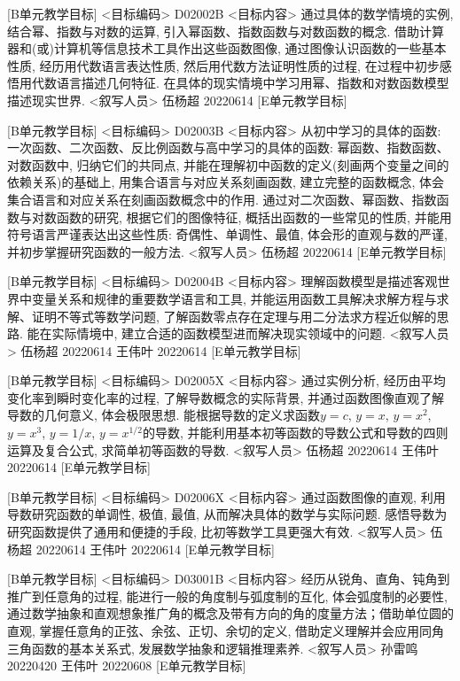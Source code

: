 \documentclass[10pt,a4paper]{article}
\begin{document}
[B单元教学目标]
<目标编码>
D02002B
<目标内容>
通过具体的数学情境的实例, 结合幂、指数与对数的运算, 引入幂函数、指数函数与对数函数的概念. 借助计算器和(或)计算机等信息技术工具作出这些函数图像, 通过图像认识函数的一些基本性质, 经历用代数语言表达性质, 然后用代数方法证明性质的过程, 在过程中初步感悟用代数语言描述几何特征. 在具体的现实情境中学习用幂、指数和对数函数模型描述现实世界.
<叙写人员>
伍杨超  20220614
[E单元教学目标]
 
[B单元教学目标]
<目标编码>
D02003B
<目标内容>
从初中学习的具体的函数: 一次函数、二次函数、反比例函数与高中学习的具体的函数: 幂函数、指数函数、对数函数中, 归纳它们的共同点, 并能在理解初中函数的定义(刻画两个变量之间的依赖关系)的基础上, 用集合语言与对应关系刻画函数, 建立完整的函数概念, 体会集合语言和对应关系在刻画函数概念中的作用. 通过对二次函数、幂函数、指数函数与对数函数的研究, 根据它们的图像特征, 概括出函数的一些常见的性质, 并能用符号语言严谨表达出这些性质: 奇偶性、单调性、最值, 体会形的直观与数的严谨, 并初步掌握研究函数的一般方法.
<叙写人员>
伍杨超  20220614
[E单元教学目标]
 
[B单元教学目标]
<目标编码>
D02004B
<目标内容>
理解函数模型是描述客观世界中变量关系和规律的重要数学语言和工具, 并能运用函数工具解决求解方程与求解、证明不等式等数学问题, 了解函数零点存在定理与用二分法求方程近似解的思路. 能在实际情境中, 建立合适的函数模型进而解决现实领域中的问题.
<叙写人员>
伍杨超  20220614
王伟叶  20220614
[E单元教学目标]
 
[B单元教学目标]
<目标编码>
D02005X
<目标内容>
通过实例分析, 经历由平均变化率到瞬时变化率的过程, 了解导数概念的实际背景, 并通过函数图像直观了解导数的几何意义, 体会极限思想. 能根据导数的定义求函数$y=c$, $y=x$, $y=x^2$, $y=x^3$, $y=1/x$, $y=x^{1/2}$的导数, 并能利用基本初等函数的导数公式和导数的四则运算及复合公式, 求简单初等函数的导数.
<叙写人员>
伍杨超  20220614
王伟叶  20220614
[E单元教学目标]
 
[B单元教学目标]
<目标编码>
D02006X
<目标内容>
通过函数图像的直观, 利用导数研究函数的单调性, 极值, 最值, 从而解决具体的数学与实际问题. 感悟导数为研究函数提供了通用和便捷的手段, 比初等数学工具更强大有效.
<叙写人员>
伍杨超  20220614
王伟叶  20220614
[E单元教学目标]




[B单元教学目标]
<目标编码>
D03001B
<目标内容>
经历从锐角、直角、钝角到推广到任意角的过程, 能进行一般的角度制与弧度制的互化, 体会弧度制的必要性, 通过数学抽象和直观想象推广角的概念及带有方向的角的度量方法；借助单位圆的直观, 掌握任意角的正弦、余弦、正切、余切的定义, 借助定义理解并会应用同角三角函数的基本关系式, 发展数学抽象和逻辑推理素养.
<叙写人员>
孙雷鸣  20220420
王伟叶  20220608
[E单元教学目标]
\end{document}
